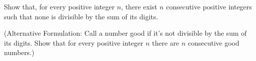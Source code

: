 Show that, for every positive integer $n$,  there exist $n$ consecutive positive integers such that none is divisible by the sum of its digits.

(Alternative Formulation: Call a number good if it's not divisible by the sum of its digits. Show that for every positive integer $n$ there are $n$ consecutive good numbers.)